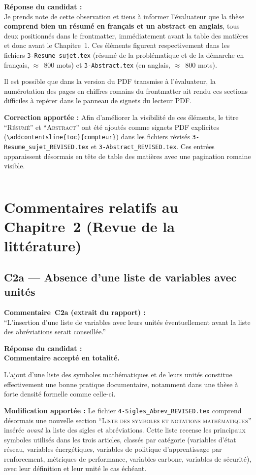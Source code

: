 \documentclass[12pt,a4paper]{article}
\newcommand{\Commentaire}[2]{%
  \begin{reviewerbox}
    \textbf{Commentaire~#1 (extrait du rapport) :}\\#2
  \end{reviewerbox}%
}
\newcommand{\Reponse}[1]{%
  \begin{responsebox}
    \textbf{Réponse du candidat :}\\#1
  \end{responsebox}%
}
\begin{document}
\Reponse{
Je prends note de cette observation et tiens à informer l'évaluateur que la thèse \textbf{comprend bien un résumé en français et un abstract en anglais}, tous deux positionnés dans le frontmatter, immédiatement avant la table des matières et donc avant le Chapitre~1. Ces éléments figurent respectivement dans les fichiers \texttt{3-Resume\_sujet.tex} (résumé de la problématique et de la démarche en français, $\approx$~800 mots) et \texttt{3-Abstract.tex} (en anglais, $\approx$~800 mots).

Il est possible que dans la version du PDF transmise à l'évaluateur, la numérotation des pages en chiffres romains du frontmatter ait rendu ces sections difficiles à repérer dans le panneau de signets du lecteur PDF.

\textbf{Correction apportée :} Afin d'améliorer la visibilité de ces éléments, le titre ``\textsc{Résumé}'' et ``\textsc{Abstract}'' ont été ajoutés comme signets PDF explicites (\texttt{\textbackslash addcontentsline\{toc\}\{compteur\}}) dans les fichiers révisés \texttt{3-Resume\_sujet\_REVISED.tex} et \texttt{3-Abstract\_REVISED.tex}. Ces entrées apparaissent désormais en tête de table des matières avec une pagination romaine visible.
}

\bigskip
\hrule
\bigskip

\section*{Commentaires relatifs au Chapitre~2 (Revue de la littérature)}

\subsection*{C2a --- Absence d'une liste de variables avec unités}

\Commentaire{C2a}{
  ``L'insertion d'une liste de variables avec leurs unités éventuellement avant la liste des
  abréviations serait conseillée.''
}

\Reponse{
\textbf{Commentaire accepté en totalité.}

L'ajout d'une liste des symboles mathématiques et de leurs unités constitue effectivement une bonne pratique documentaire, notamment dans une thèse à forte densité formelle comme celle-ci.

\textbf{Modification apportée :} Le fichier \texttt{4-Sigles\_Abrev\_REVISED.tex} comprend désormais une nouvelle section ``\textsc{Liste des symboles et notations mathématiques}'' insérée \emph{avant} la liste des sigles et abréviations. Cette liste recense les principaux symboles utilisés dans les trois articles, classés par catégorie (variables d'état réseau, variables énergétiques, variables de politique d'apprentissage par renforcement, métriques de performance, variables carbone, variables de sécurité), avec leur définition et leur unité le cas échéant.
}
\end{document}
